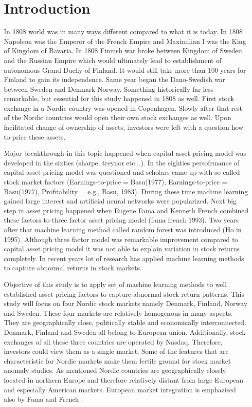 \documentclass{article}
\begin{document}
\section{Introduction} \label{Introduction}
In 1808 world was in many ways different compared to what it is today. In 1808 Napoleon was the Emperor of the French Empire and Maximilian I was the King of Kingdom of Bavaria. In 1808 Finnish war broke between Kingdom of Sweden and the Russian Empire which would ultimately lead to establishment of autonomous Grand Duchy of Finland. It would still take more than 100 years for Finland to gain its independence. Same year began the Dano-Swedish war between Sweden and Denmark-Norway. Something historically far less remarkable, but essential for this study happened in 1808 as well. First stock exchange in a Nordic country was opened in Copenhagen. Slowly after that rest of the Nordic countries would open their own stock exchanges as well. Upon facilitated change of ownership of assets, investors were left with a question how to price these assets.

Major breakthrough in this topic happened when capital asset pricing model was developed in the sixties (sharpe, treynor etc...). In the eighties persofrmance of capital asset pricing model was questioned and scholars came up with so called stock market factors (Earnings-to-price = Basu(1977), Earnings-to-price = Basu(1977), Profitability = e.g., Basu, 1983). During these time machine learning gained large interest and artificial neural networks were popularized. Next big step in asset pricing happened when Eugene Fama and Kenneth French combined these factors to three factor asset pricing model (fama french 1993). Two years after that machine learning method called random forest was introduced (Ho in 1995). Although three factor model was remarkable improvement compared to capital asset pricing model it was not able to explain variation in stock returns completely. In recent years lot of research has applied machine learning methods to capture abnormal returns in stock markets. 

Objective of this study is to apply set of machine learning methods to well established asset pricing factors to capture abnormal stock return patterns. This study will focus on four Nordic stock markets namely Denmark, Finland, Norway and Sweden. These four markets are relatively homogenous in many aspects. They are geographically close, politically stable and economically interconnected. Denmark, Finland and Sweden all belong to European union. Additionally, stock exchanges of all these three countries are operated by Nasdaq. Therefore, investors could view them as a single market. Some of the features that are characteristic for Nordic markets make them fertile ground for stock market anomaly studies. As mentioned Nordic countries are geographically closely located in northern Europe and therefore relatively distant from large European and especially American markets. European market integration is emphazised also by Fama and French \citeyear{FAMA2012457}. 
\end{document}
